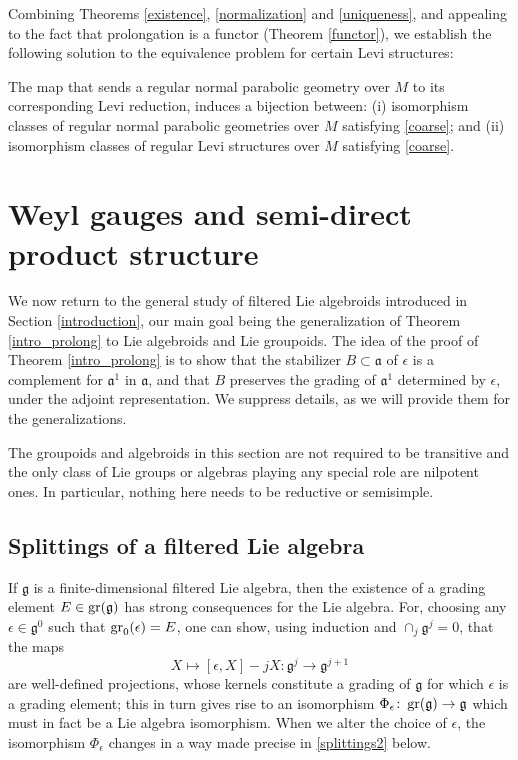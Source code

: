 \documentclass[leqno,12pt]{amsart} %
\newcommand\refreshpage{\newpage}
\newcommand\refreshpage{}
\begin{document}
Combining Theorems \ref{existence}, \ref{normalization} and \ref{uniqueness}, and
appealing to the fact that prolongation is a functor (Theorem \ref{functor}), we establish
the following solution to the equivalence problem for certain Levi structures:

\begin{theorem}
  The map that sends a regular normal parabolic geometry over $M$
  to its corresponding Levi reduction, induces a bijection between: (i) isomorphism classes
  of regular normal parabolic geometries over $M$ satisfying \eqref{coarse}; and (ii)
  isomorphism classes of regular Levi structures over $M$ satisfying \eqref{coarse}.
\end{theorem}

\refreshpage
\section{Weyl gauges and semi-direct product structure}\label{semi-direct}
We now return to the general study of filtered Lie algebroids introduced in Section
\ref{introduction}, our main goal being the generalization of Theorem \ref{intro_prolong}
to Lie algebroids and Lie groupoids. The idea of the proof of Theorem \ref{intro_prolong}
is to show that the stabilizer $B \subset {\mathfrak a}$ of $\epsilon $ is a complement
for ${\mathfrak a}^1 $ in ${\mathfrak a} $, and that $B$ preserves the grading of
${\mathfrak a^1} $ determined by $\epsilon $, under the adjoint representation. We
suppress details, as we will provide them for the generalizations.

\vspace{0.5\baselineskip} The groupoids and algebroids in this section are not required to
be transitive and the only class of Lie groups or algebras playing any special role are
nilpotent ones. In particular, nothing here needs to be reductive or semisimple.

\subsection{Splittings of a filtered Lie algebra}
\label{splittings}
If ${\mathfrak g}$ is a finite-dimensional filtered Lie algebra, then the existence of a
grading element $E \in \operatorname{\operatorname{gr}}({\mathfrak g})$ has strong consequences for the Lie
algebra. For, choosing any $\epsilon \in {\mathfrak g}^0$ such that
$\operatorname{\operatorname{gr}}_0(\epsilon) = E$, one can show, using induction and $\cap_j {\mathfrak g}^j=0$,
that the maps
$$ X \mapsto  [\epsilon, X] - jX \colon {\mathfrak g}^j \rightarrow {\mathfrak g}^{j+1}$$
are well-defined projections, whose kernels constitute a grading of ${\mathfrak g} $ for
which $\epsilon$ is a grading element; this in turn gives rise to an isomorphism
$\Phi_\epsilon\colon \operatorname{\operatorname{gr}}({\mathfrak g}) \rightarrow {\mathfrak g}$ which must in fact be a
Lie algebra isomorphism. When we alter the choice of $\epsilon$, the isomorphism $\Phi_\epsilon$ changes
in a way made precise in \eqref{splittings2} below.
\end{document}
